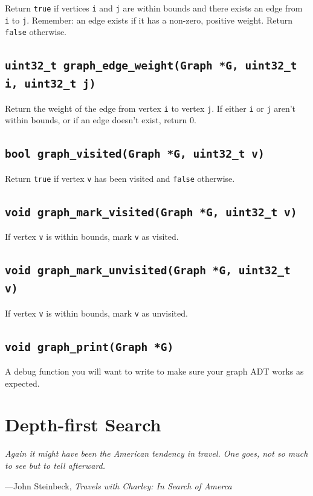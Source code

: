 \documentclass[11pt]{article}
\begin{document}
Return \texttt{true} if vertices \texttt{i} and \texttt{j} are within
bounds and there exists an edge from \texttt{i} to \texttt{j}. Remember:
an edge exists if it has a non-zero, positive weight. Return
\texttt{false} otherwise.

\subsection{\texttt{uint32\_t graph\_edge\_weight(Graph *G, uint32\_t i,
uint32\_t j)}}

Return the weight of the edge from vertex \texttt{i} to vertex
\texttt{j}. If either \texttt{i} or \texttt{j} aren't within bounds, or
if an edge doesn't exist, return 0.

\subsection{\texttt{bool graph\_visited(Graph *G, uint32\_t v)}}

Return \texttt{true} if vertex \texttt{v} has been visited and
\texttt{false} otherwise.

\subsection{\texttt{void graph\_mark\_visited(Graph *G, uint32\_t v)}}

If vertex \texttt{v} is within bounds, mark \texttt{v} as visited.

\subsection{\texttt{void graph\_mark\_unvisited(Graph *G, uint32\_t v)}}

If vertex \texttt{v} is within bounds, mark \texttt{v} as unvisited.

\subsection{\texttt{void graph\_print(Graph *G)}}

A debug function you will want to write to make sure your graph ADT
works as expected.

\section{Depth-first Search}

\textwidth \epigraph{\emph{Again it might have been
the American tendency in travel. One goes, not so much to see but to
tell afterward.}}{---John Steinbeck, \emph{Travels with Charley: In
Search of Amerca}}
\end{document}
